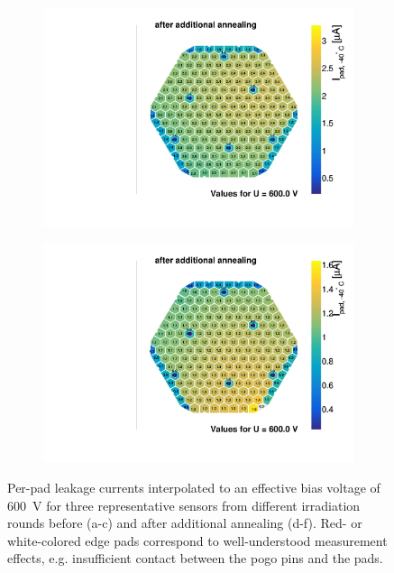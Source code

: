\begin{figure}
\begin{subfigure}[b]{0.32\textwidth}
		\includegraphics[width=0.999\textwidth]{plots/iv_hexplots/0541_04_annealed.pdf}
		\subcaption{
		}
		\label{plot:iv_hexplot_0541_04_annealed}
	\end{subfigure}
	\hfill	
	\begin{subfigure}[b]{0.32\textwidth}
		\includegraphics[width=0.999\textwidth]{plots/iv_hexplots/1013_annealed.pdf}
		\subcaption{
		}
		\label{plot:iv_hexplot_1013_annealed}
	\end{subfigure}    
	\caption{
		Per-pad leakage currents interpolated to an effective bias voltage of \SI{600}{\volt} for three representative sensors from different irradiation rounds before (a-c) and after additional annealing (d-f).
		Red- or white-colored edge pads correspond to well-understood measurement effects, e.g. insufficient contact between the pogo pins and the pads.
		}
	\label{plot:iv_hexplot}
\end{figure}


